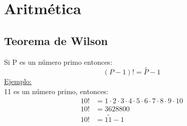 \newpage
\section{Aritmética}
\begin{multicols}{2}
\subsection{Teorema de Wilson}
Si P es un número primo entonces:
$$ (P-1)! = \overset{\circ}{P} - 1 $$
\underline{Ejemplo:}\\
11 es un número primo, entonces:
\begin{equation*}
\begin{split}
10! &= 1\cdot2\cdot3\cdot4\cdot5\cdot6\cdot7\cdot8\cdot9\cdot10 \\
10! &= 3628800\\
10! &= \overset{\circ}{11} - 1
\end{split}
\end{equation*}


\end{multicols}